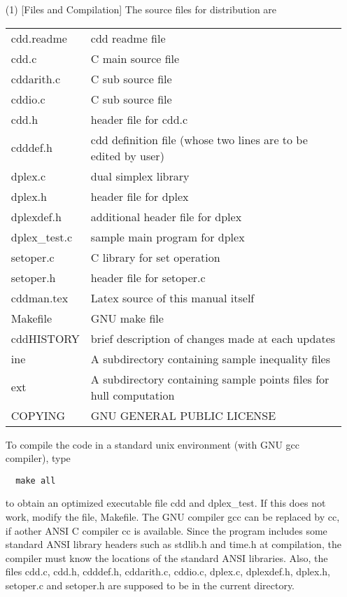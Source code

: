 \documentclass[11pt]{article}
\begin{document}
\begin{itemize}
\item[(1)] [Files and Compilation] The source files for distribution are

\begin{tabular}{ll}
     cdd.readme  &  cdd readme file\\
     cdd.c       &   C main source file\\
     cddarith.c  &   C sub source file\\  
     cddio.c     &   C sub source file\\  
     cdd.h       &   header file for cdd.c\\
     cdddef.h    &   cdd definition file (whose two lines are to be edited by user)\\
     dplex.c     &  dual simplex library\\
     dplex.h     & header file for dplex\\
     dplexdef.h  & additional header file for dplex\\
     dplex\_test.c  & sample main program for dplex\\
     setoper.c   &   C library for set operation\\
     setoper.h   &   header file for setoper.c \\
     cddman.tex  &  Latex source of this manual itself\\
     Makefile    &   GNU make file\\
     cddHISTORY  &   brief description of changes made at each updates\\
     ine         &   A subdirectory containing sample inequality files\\
     ext         &   A subdirectory containing sample points files for hull computation\\
     COPYING     &   GNU GENERAL PUBLIC LICENSE
\end{tabular}

\noindent
To compile the code in a standard unix environment (with GNU gcc compiler), type
\begin{verbatim}
  make all
\end{verbatim}
to obtain an optimized executable file cdd and dplex\_test.  If this does not work,
modify the file, Makefile. The GNU compiler gcc can be replaced by cc, 
if aother ANSI  C compiler cc is available.
Since the program includes some standard ANSI library 
headers such as stdlib.h and time.h at compilation, 
the compiler must know the locations of the standard ANSI libraries.
Also, the files cdd.c, cdd.h, cdddef.h, cddarith.c, cddio.c, dplex.c, dplexdef.h,
dplex.h, setoper.c and  setoper.h are supposed to be
in the current directory.


\end{itemize}
\end{document}

